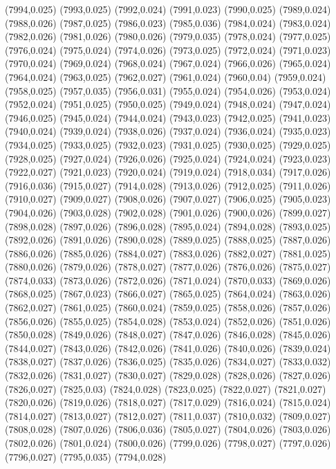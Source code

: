(7994,0.025)
(7993,0.025)
(7992,0.024)
(7991,0.023)
(7990,0.025)
(7989,0.024)
(7988,0.026)
(7987,0.025)
(7986,0.023)
(7985,0.036)
(7984,0.024)
(7983,0.024)
(7982,0.026)
(7981,0.026)
(7980,0.026)
(7979,0.035)
(7978,0.024)
(7977,0.025)
(7976,0.024)
(7975,0.024)
(7974,0.026)
(7973,0.025)
(7972,0.024)
(7971,0.023)
(7970,0.024)
(7969,0.024)
(7968,0.024)
(7967,0.024)
(7966,0.026)
(7965,0.024)
(7964,0.024)
(7963,0.025)
(7962,0.027)
(7961,0.024)
(7960,0.04)
(7959,0.024)
(7958,0.025)
(7957,0.035)
(7956,0.031)
(7955,0.024)
(7954,0.026)
(7953,0.024)
(7952,0.024)
(7951,0.025)
(7950,0.025)
(7949,0.024)
(7948,0.024)
(7947,0.024)
(7946,0.025)
(7945,0.024)
(7944,0.024)
(7943,0.023)
(7942,0.025)
(7941,0.023)
(7940,0.024)
(7939,0.024)
(7938,0.026)
(7937,0.024)
(7936,0.024)
(7935,0.023)
(7934,0.025)
(7933,0.025)
(7932,0.023)
(7931,0.025)
(7930,0.025)
(7929,0.025)
(7928,0.025)
(7927,0.024)
(7926,0.026)
(7925,0.024)
(7924,0.024)
(7923,0.023)
(7922,0.027)
(7921,0.023)
(7920,0.024)
(7919,0.024)
(7918,0.034)
(7917,0.026)
(7916,0.036)
(7915,0.027)
(7914,0.028)
(7913,0.026)
(7912,0.025)
(7911,0.026)
(7910,0.027)
(7909,0.027)
(7908,0.026)
(7907,0.027)
(7906,0.025)
(7905,0.023)
(7904,0.026)
(7903,0.028)
(7902,0.028)
(7901,0.026)
(7900,0.026)
(7899,0.027)
(7898,0.028)
(7897,0.026)
(7896,0.028)
(7895,0.024)
(7894,0.028)
(7893,0.025)
(7892,0.026)
(7891,0.026)
(7890,0.028)
(7889,0.025)
(7888,0.025)
(7887,0.026)
(7886,0.026)
(7885,0.026)
(7884,0.027)
(7883,0.026)
(7882,0.027)
(7881,0.025)
(7880,0.026)
(7879,0.026)
(7878,0.027)
(7877,0.026)
(7876,0.026)
(7875,0.027)
(7874,0.033)
(7873,0.026)
(7872,0.026)
(7871,0.024)
(7870,0.033)
(7869,0.026)
(7868,0.025)
(7867,0.023)
(7866,0.027)
(7865,0.025)
(7864,0.024)
(7863,0.026)
(7862,0.027)
(7861,0.025)
(7860,0.024)
(7859,0.025)
(7858,0.026)
(7857,0.026)
(7856,0.026)
(7855,0.025)
(7854,0.028)
(7853,0.024)
(7852,0.026)
(7851,0.026)
(7850,0.028)
(7849,0.026)
(7848,0.027)
(7847,0.026)
(7846,0.028)
(7845,0.026)
(7844,0.027)
(7843,0.026)
(7842,0.026)
(7841,0.026)
(7840,0.026)
(7839,0.024)
(7838,0.027)
(7837,0.026)
(7836,0.025)
(7835,0.026)
(7834,0.027)
(7833,0.032)
(7832,0.026)
(7831,0.027)
(7830,0.027)
(7829,0.028)
(7828,0.026)
(7827,0.026)
(7826,0.027)
(7825,0.03)
(7824,0.028)
(7823,0.025)
(7822,0.027)
(7821,0.027)
(7820,0.026)
(7819,0.026)
(7818,0.027)
(7817,0.029)
(7816,0.024)
(7815,0.024)
(7814,0.027)
(7813,0.027)
(7812,0.027)
(7811,0.037)
(7810,0.032)
(7809,0.027)
(7808,0.028)
(7807,0.026)
(7806,0.036)
(7805,0.027)
(7804,0.026)
(7803,0.026)
(7802,0.026)
(7801,0.024)
(7800,0.026)
(7799,0.026)
(7798,0.027)
(7797,0.026)
(7796,0.027)
(7795,0.035)
(7794,0.028)
